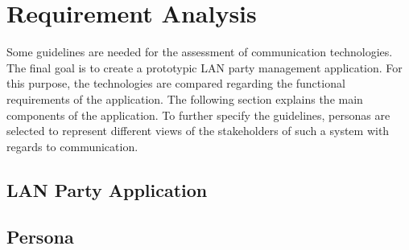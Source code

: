 
\chapter{Requirement Analysis}\label{cha:Requirement}

Some guidelines are needed for the assessment of communication technologies.
The final goal is to create a prototypic \ac{LAN} party management application.
For this purpose, the technologies are compared regarding the functional requirements of the application.
The following section explains the main components of the application.
To further specify the guidelines, personas are selected to represent different views of the stakeholders of such a system with regards to communication.

\section{LAN Party Application}\label{cha:Requirement:lanpartyapplication}


\pagebreak

\section{Persona}\label{cha:Requirement:persona}
